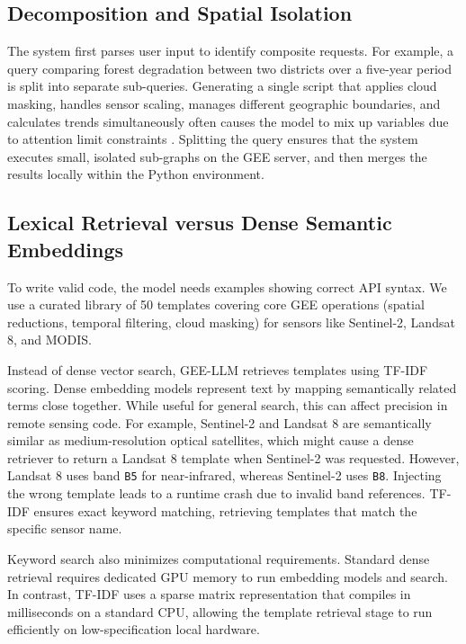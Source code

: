 \documentclass[pdflatex,sn-mathphys-ay]{sn-jnl}
\begin{document}
\subsection{Decomposition and Spatial Isolation}\label{sec:arch_decomp}
The system first parses user input to identify composite requests. For example, a query comparing forest degradation between two districts over a five-year period is split into separate sub-queries. Generating a single script that applies cloud masking, handles sensor scaling, manages different geographic boundaries, and calculates trends simultaneously often causes the model to mix up variables due to attention limit constraints \citep{Vaswani2017}. Splitting the query ensures that the system executes small, isolated sub-graphs on the GEE server, and then merges the results locally within the Python environment.

\subsection{Lexical Retrieval versus Dense Semantic Embeddings}\label{sec:arch_tfidf}
To write valid code, the model needs examples showing correct API syntax. We use a curated library of 50 templates covering core GEE operations (spatial reductions, temporal filtering, cloud masking) for sensors like Sentinel-2, Landsat 8, and MODIS.

Instead of dense vector search, GEE-LLM retrieves templates using TF-IDF scoring. Dense embedding models represent text by mapping semantically related terms close together. While useful for general search, this can affect precision in remote sensing code. For example, Sentinel-2 and Landsat 8 are semantically similar as medium-resolution optical satellites, which might cause a dense retriever to return a Landsat 8 template when Sentinel-2 was requested. However, Landsat 8 uses band \texttt{B5} for near-infrared, whereas Sentinel-2 uses \texttt{B8}. Injecting the wrong template leads to a runtime crash due to invalid band references. TF-IDF ensures exact keyword matching, retrieving templates that match the specific sensor name.

Keyword search also minimizes computational requirements. Standard dense retrieval requires dedicated GPU memory to run embedding models and search. In contrast, TF-IDF uses a sparse matrix representation that compiles in milliseconds on a standard CPU, allowing the template retrieval stage to run efficiently on low-specification local hardware.
\end{document}
